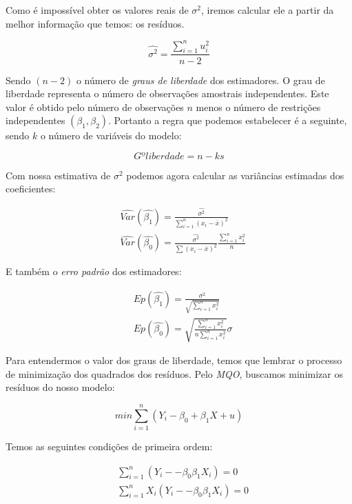 \documentclass[12pt,a4paper,oneside,brazil]{abntex2}
\begin{document}
Como é impossível obter os valores reais de $\sigma^2$, iremos calcular ele a partir da melhor informação que temos: os resíduos.

\begin{equation}
   \hat{\sigma^2} = \frac{\sum \limits^{n}_{i = 1} u_i ^2}{n - 2}
 \end{equation} 
 
Sendo $( n - 2 )$ o número de \textit{graus de liberdade} dos estimadores. O grau de liberdade representa o número de observações amostrais independentes. Este valor é obtido pelo número de observações $n$ menos o número de restrições independentes $(\beta_1, \beta_2)$. Portanto a regra que podemos estabelecer é a seguinte, sendo $k$ o número de variáveis do modelo:

\begin{equation}
Gº liberdade = n - ks   
\end{equation}

Com nossa estimativa de $\sigma^2$ podemos agora calcular as variâncias estimadas dos coeficientes:

\begin{align}
& \hat{Var} (\hat{\beta_1}) = \frac{\hat{\sigma^2}}{\sum \limits^{n}_{i = 1} (x_i - \overline{x})^2} \\
& \hat{Var}(\hat{\beta_0}) = \frac{\hat{\sigma^2}}{\sum \limits (x_i - \overline{x})^2} \frac{\sum \limits^{n}_{i = 1} x_i^2}{n}
\end{align}

E também o \textit{erro padrão} dos estimadores:

\begin{align}
    & Ep (\hat{\beta_1}) = \frac{\sigma^2}{\sqrt{\sum \limits^{n}_{i=1} x_i^2}} \\
    & Ep (\hat{\beta_0}) = \sqrt{\frac{\sum \limits^{n}_{i=1} x_i^2}{n \sum \limits^{n}_{i=1} x_i^2}} \sigma
\end{align}

Para entendermos o valor dos graus de liberdade, temos que lembrar o processo de minimização dos quadrados dos resíduos. Pelo \emph{MQO}, buscamos minimizar os resíduos do nosso modelo:

\begin{equation}
min \sum \limits^{n}_{i=1} (Y_i - \beta_0 + \beta_1 X + u)
\end{equation}

Temos as seguintes condições de primeira ordem:

\begin{align}
& \sum \limits^{n}_{i=1} (Y_i - - \beta_0  \beta_1 X_i) = 0 \label{cpo1} \\
& \sum \limits^{n}_{i=1} X_i (Y_i - - \beta_0  \beta_1 X_i) = 0 \label{cpo2} \\
\end{align}
\end{document}
